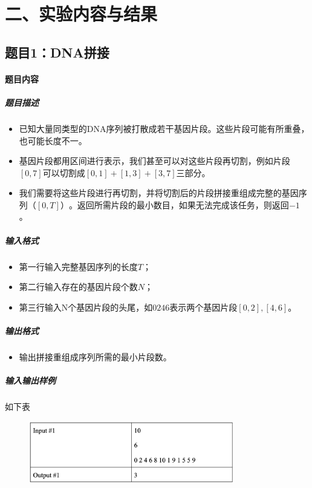 \documentclass[12pt,a4paper]{ctexart}
\begin{document}
\vspace{5pt}

\section*{二、实验内容与结果}
\subsection*{题目1：DNA拼接}
\paragraph{题目内容}
\subparagraph{题目描述}
\begin{itemize}
    \item 已知大量同类型的DNA序列被打散成若干基因片段。这些片段可能有所重叠，也可能长度不一。
    \item 基因片段都用区间进行表示，我们甚至可以对这些片段再切割，例如片段$[0, 7]$可以切割成$[0, 1]+[1, 3]+[3, 7]$三部分。
    \item 我们需要将这些片段进行再切割，并将切割后的片段拼接重组成完整的基因序列$（[0, T]）$。返回所需片段的最小数目，如果无法完成该任务，则返回$-1$ 。
\end{itemize}

\subparagraph{输入格式}
    \begin{itemize}
        \item 第一行输入完整基因序列的长度$T$；
        \item 第二行输入存在的基因片段个数$N$；
        \item 第三行输入N个基因片段的头尾，如$0 2 4 6$表示两个基因片段$[0,2],[4,6]$。
    \end{itemize}
\subparagraph{输出格式}
    \begin{itemize}
        \item 输出拼接重组成序列所需的最小片段数。
    \end{itemize}

\subparagraph{输入输出样例}
如下表
    \begin{figure}[h]
        \centering
        \includegraphics[width=0.80\textwidth]{q1_iodata.png}
    \end{figure}
\end{document}
